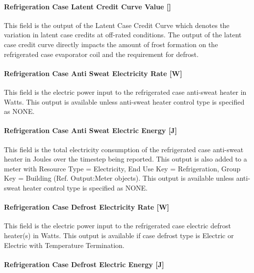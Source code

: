 \paragraph{Refrigeration Case Latent Credit Curve Value {[]}}\label{refrigeration-case-latent-credit-curve-value}

This field is the output of the Latent Case Credit Curve which denotes the variation in latent case credits at off-rated conditions. The output of the latent case credit curve directly impacts the amount of frost formation on the refrigerated case evaporator coil and the requirement for defrost.

\paragraph{Refrigeration Case Anti Sweat Electricity Rate {[}W{]}}\label{refrigeration-case-anti-sweat-electric-power-w}

This field is the electric power input to the refrigerated case anti-sweat heater in Watts. This output is available unless anti-sweat heater control type is specified as NONE.

\paragraph{Refrigeration Case Anti Sweat Electric Energy {[}J{]}}\label{refrigeration-case-anti-sweat-electric-energy-j}

This field is the total electricity consumption of the refrigerated case anti-sweat heater in Joules over the timestep being reported. This output is also added to a meter with Resource Type = Electricity, End Use Key = Refrigeration, Group Key = Building (Ref. Output:Meter objects). This output is available unless anti-sweat heater control type is specified as NONE.

\paragraph{Refrigeration Case Defrost Electricity Rate {[}W{]}}\label{refrigeration-case-defrost-electric-power-w}

This field is the electric power input to the refrigerated case electric defrost heater(s) in Watts. This output is available if case defrost type is Electric or Electric with Temperature Termination.

\paragraph{Refrigeration Case Defrost Electric Energy {[}J{]}}\label{refrigeration-case-defrost-electric-energy-j}

